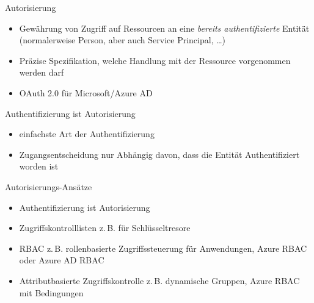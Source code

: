 

\begin{flashcard}[Definition]{Autorisierung}
  \begin{itemize}
    \item Gewährung von Zugriff auf Ressourcen an eine \emph{bereits authentifizierte} Entität\newline
    (normalerweise Person, aber auch Service Principal, \ldots)
    \item Präzise Spezifikation, welche Handlung mit der Ressource vorgenommen werden darf
    \item OAuth 2.0 für Microsoft/Azure AD
  \end{itemize}
\end{flashcard}

\begin{flashcard}[Definition]{Authentifizierung ist Autorisierung}
  \begin{itemize}
    \item einfachste Art der Authentifizierung
    \item Zugangsentscheidung nur Abhängig davon, dass die Entität Authentifiziert worden ist
  \end{itemize}
\end{flashcard}

\begin{flashcard}[Definition]{Autorisierungs-Ansätze}
  \begin{itemize}
    \item Authentifizierung ist Autorisierung
    \item Zugriffskontrolllisten\newline
      z.\,B. für Schlüsseltresore
    \item RBAC\newline
      z.\,B. rollenbasierte Zugriffssteuerung für Anwendungen, Azure RBAC oder Azure AD RBAC
    \item Attributbasierte Zugriffskontrolle\newline
      z.\,B. dynamische Gruppen, Azure RBAC mit Bedingungen
  \end{itemize}
\end{flashcard}


